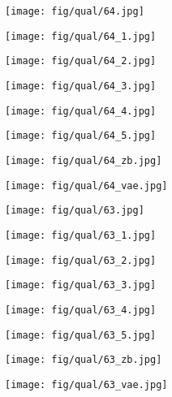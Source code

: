 \documentclass[10pt,twocolumn,letterpaper]{article}
\newcommand{\sze}{0.13}
\newcommand{\szle}{0.08}
\begin{document}
\begin{figure*}
\begin{subfigure}[c]{\sze\linewidth}
\texttt{[image: fig/qual/64.jpg]}
\end{subfigure}
\begin{subfigure}[c]{\sze\linewidth}
\texttt{[image: fig/qual/64\_1.jpg]}
\end{subfigure}
\begin{subfigure}[c]{\sze\linewidth}
\texttt{[image: fig/qual/64\_2.jpg]}
\end{subfigure}
\begin{subfigure}[c]{\sze\linewidth}
\texttt{[image: fig/qual/64\_3.jpg]}
\end{subfigure}
\begin{subfigure}[c]{\sze\linewidth}
\texttt{[image: fig/qual/64\_4.jpg]}
\end{subfigure}
\hspace{3pt}
\begin{subfigure}[c]{\sze\linewidth}
\texttt{[image: fig/qual/64\_5.jpg]}
\end{subfigure}
\begin{subfigure}[c]{\szle\linewidth}
\texttt{[image: fig/qual/64\_zb.jpg]}
\end{subfigure}
\hspace{3pt}
\begin{subfigure}[c]{\szle\linewidth}
\texttt{[image: fig/qual/64\_vae.jpg]}
\end{subfigure}

\begin{subfigure}[c]{\sze\linewidth}
\texttt{[image: fig/qual/63.jpg]}
\end{subfigure}
\begin{subfigure}[c]{\sze\linewidth}
\texttt{[image: fig/qual/63\_1.jpg]}
\end{subfigure}
\begin{subfigure}[c]{\sze\linewidth}
\texttt{[image: fig/qual/63\_2.jpg]}
\end{subfigure}
\begin{subfigure}[c]{\sze\linewidth}
\texttt{[image: fig/qual/63\_3.jpg]}
\end{subfigure}
\begin{subfigure}[c]{\sze\linewidth}
\texttt{[image: fig/qual/63\_4.jpg]}
\end{subfigure}
\hspace{3pt}
\begin{subfigure}[c]{\sze\linewidth}
\texttt{[image: fig/qual/63\_5.jpg]}
\end{subfigure}
\begin{subfigure}[c]{\szle\linewidth}
\texttt{[image: fig/qual/63\_zb.jpg]}
\end{subfigure}
\hspace{3pt}
\begin{subfigure}[c]{\szle\linewidth}
\texttt{[image: fig/qual/63\_vae.jpg]}
\end{subfigure}


\end{figure*}
\end{document}
